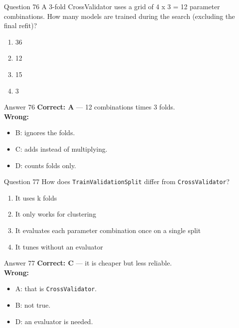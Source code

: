 \documentclass[aspectratio=169,11pt]{beamer}
\begin{document}
	\begin{frame}{Question 76}
		A 3-fold CrossValidator uses a grid of 4 x 3 = 12 parameter combinations. How many models are trained during the search (excluding the final refit)?
		\begin{enumerate}[label=\Alph*.]
			\item 36
			\item 12
			\item 15
			\item 3
		\end{enumerate}
	\end{frame}
	\begin{frame}{Answer 76}
		\textbf{Correct: A} --- 12 combinations times 3 folds.\\
		\vspace{0.5em}
		\textbf{Wrong:}
		\begin{itemize}
			\item B: ignores the folds.
			\item C: adds instead of multiplying.
			\item D: counts folds only.
		\end{itemize}
	\end{frame}
	
	\begin{frame}{Question 77}
		How does \texttt{TrainValidationSplit} differ from \texttt{CrossValidator}?
		\begin{enumerate}[label=\Alph*.]
			\item It uses k folds
			\item It only works for clustering
			\item It evaluates each parameter combination once on a single split
			\item It tunes without an evaluator
		\end{enumerate}
	\end{frame}
	\begin{frame}{Answer 77}
		\textbf{Correct: C} --- it is cheaper but less reliable.\\
		\vspace{0.5em}
		\textbf{Wrong:}
		\begin{itemize}
			\item A: that is \texttt{CrossValidator}.
			\item B: not true.
			\item D: an evaluator is needed.
		\end{itemize}
	\end{frame}
	
\end{document}
